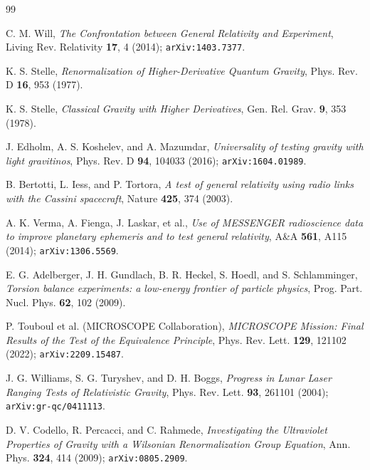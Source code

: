 \documentclass[11pt,a4paper]{article}
\begin{document}
\begin{thebibliography}{99}

C. M. Will,
\textit{The Confrontation between General Relativity and Experiment},
Living Rev. Relativity \textbf{17}, 4 (2014);
\texttt{arXiv:1403.7377}.

K. S. Stelle,
\textit{Renormalization of Higher-Derivative Quantum Gravity},
Phys. Rev. D \textbf{16}, 953 (1977).

K. S. Stelle,
\textit{Classical Gravity with Higher Derivatives},
Gen. Rel. Grav. \textbf{9}, 353 (1978).

J. Edholm, A. S. Koshelev, and A. Mazumdar,
\textit{Universality of testing gravity with light gravitinos},
Phys. Rev. D \textbf{94}, 104033 (2016);
\texttt{arXiv:1604.01989}.

B. Bertotti, L. Iess, and P. Tortora,
\textit{A test of general relativity using radio links with the
Cassini spacecraft},
Nature \textbf{425}, 374 (2003).

A. K. Verma, A. Fienga, J. Laskar, et al.,
\textit{Use of MESSENGER radioscience data to improve planetary
ephemeris and to test general relativity},
A\&A \textbf{561}, A115 (2014);
\texttt{arXiv:1306.5569}.

E. G. Adelberger, J. H. Gundlach, B. R. Heckel, S. Hoedl, and S. Schlamminger,
\textit{Torsion balance experiments: a low-energy frontier of particle physics},
Prog. Part. Nucl. Phys. \textbf{62}, 102 (2009).

P. Touboul et al. (MICROSCOPE Collaboration),
\textit{MICROSCOPE Mission: Final Results of the Test of the
Equivalence Principle},
Phys. Rev. Lett. \textbf{129}, 121102 (2022);
\texttt{arXiv:2209.15487}.

J. G. Williams, S. G. Turyshev, and D. H. Boggs,
\textit{Progress in Lunar Laser Ranging Tests of Relativistic Gravity},
Phys. Rev. Lett. \textbf{93}, 261101 (2004);
\texttt{arXiv:gr-qc/0411113}.

D. V. Codello, R. Percacci, and C. Rahmede,
\textit{Investigating the Ultraviolet Properties of Gravity with a
Wilsonian Renormalization Group Equation},
Ann. Phys. \textbf{324}, 414 (2009);
\texttt{arXiv:0805.2909}.

\end{thebibliography}
\end{document}
